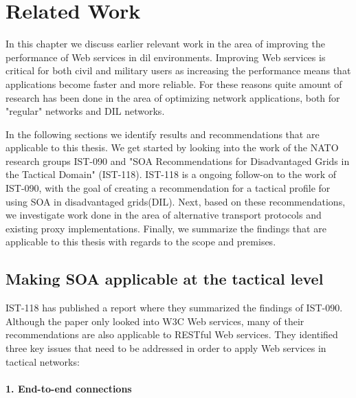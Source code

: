 \chapter{Related Work}
\label{chapter:related-work}


In this chapter we discuss earlier relevant work in the area of improving the
performance of Web services in \gls{dil} environments. Improving Web services
is critical for both civil and military users as increasing the performance
means that applications become faster and more reliable. For these reasons
quite amount of research has been done in the area of optimizing network
applications, both for "regular" networks and DIL networks.

In the following sections we identify results and recommendations that are
applicable to this thesis. We get started by looking into the work of the NATO
research groups IST-090 and "SOA Recommendations for Disadvantaged Grids in
the Tactical Domain" (IST-118). IST-118 is a ongoing follow-on to the work of
IST-090, with the goal of creating a recommendation for a tactical profile for
using SOA in disadvantaged grids(DIL). Next, based on these recommendations, we
investigate work done in the area of alternative transport protocols and
existing proxy implementations.  Finally, we summarize the findings that are
applicable to this thesis with regards to the scope and premises.

\section{Making SOA applicable at the tactical level}

IST-118 has published a report where they summarized the findings of IST-090.
Although the paper only looked into W3C Web services, many of their
recommendations are also applicable to RESTful Web services. They identified
three key issues that need to be addressed in order to apply Web services in
tactical networks\cite{ist-090, ist-118}:

\label{section:DIL-problems}

\subsubsection{1. End-to-end connections}

